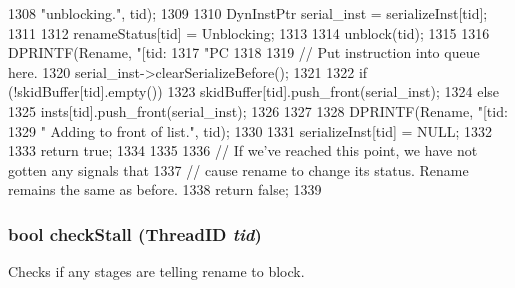 \begin{DoxyCode}
{{1308                 "unblocking.\n", tid);
1309 
1310         DynInstPtr serial_inst = serializeInst[tid];
1311 
1312         renameStatus[tid] = Unblocking;
1313 
1314         unblock(tid);
1315 
1316         DPRINTF(Rename, "[tid:%
1317                 "PC %
1318 
1319         // Put instruction into queue here.
1320         serial_inst->clearSerializeBefore();
1321 
1322         if (!skidBuffer[tid].empty()) {
1323             skidBuffer[tid].push_front(serial_inst);
1324         } else {
1325             insts[tid].push_front(serial_inst);
1326         }
1327 
1328         DPRINTF(Rename, "[tid:%
1329                 " Adding to front of list.\n", tid);
1330 
1331         serializeInst[tid] = NULL;
1332 
1333         return true;
1334     }
1335 
1336     // If we've reached this point, we have not gotten any signals that
1337     // cause rename to change its status.  Rename remains the same as before.
1338     return false;
1339 }
\end{DoxyCode}
\hypertarget{classDefaultRename_a2dd2400250619a315cb46f95f777db01}{
\subsubsection[{checkStall}]{\setlength{\rightskip}{0pt plus 5cm}bool checkStall ({\bf ThreadID} {\em tid})}}
\label{classDefaultRename_a2dd2400250619a315cb46f95f777db01}
Checks if any stages are telling rename to block. 


